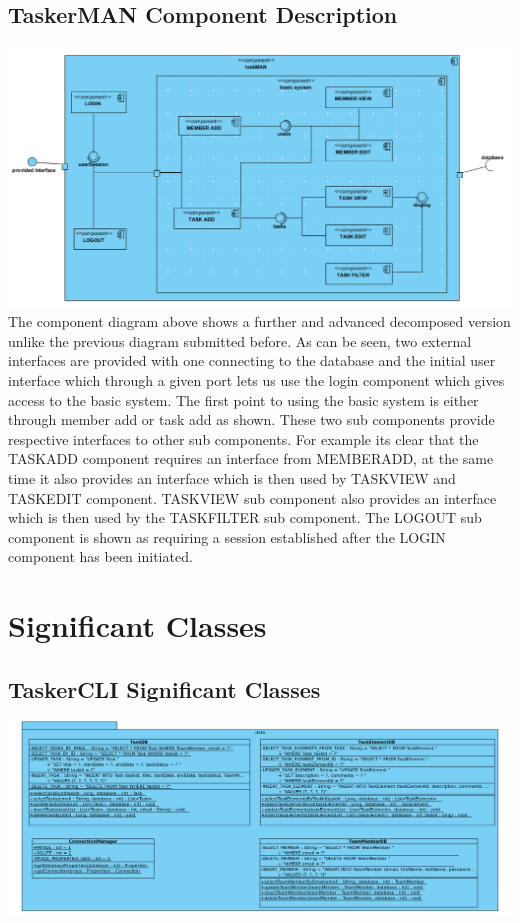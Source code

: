 \documentclass{project}
\begin{document}
\subsection{TaskerMAN Component Description}
\includegraphics[width=1\textwidth, center]{images/Detailed-Design/TaskerMANComponentDiagram}
The component diagram above shows a further and advanced decomposed version unlike the previous diagram submitted before.  As can be seen, two external interfaces are provided with one connecting to the database and the initial user interface which through a given port lets us use the login component which gives access to the basic system.  The first point to using the basic system is either through member add or task add as shown. These two sub components provide respective interfaces to other sub components.  For example its clear that the TASK\textunderscore ADD component requires  an interface from MEMBER\textunderscore ADD, at the same time it also provides an interface which is then used by TASK\textunderscore VIEW and TASK\textunderscore EDIT component. TASK\textunderscore VIEW sub component also provides an interface which is then used by the TASK\textunderscore FILTER sub component. 
The LOGOUT sub component is shown as requiring a session established after the LOGIN component has been initiated. 
\clearpage
\section{Significant Classes} 
\subsection{TaskerCLI Significant Classes}
\includegraphics[width=\textwidth]{images/Detailed-Design/taskerCLI_design1.png}
\end{document}
